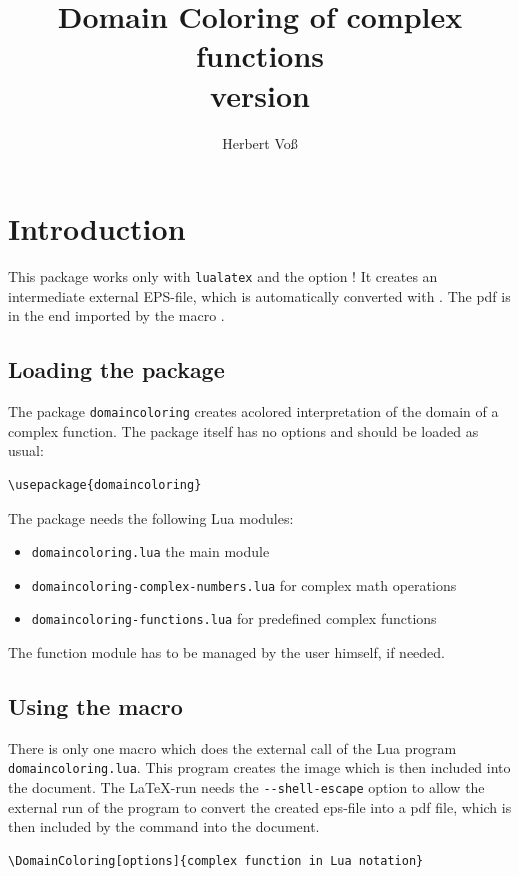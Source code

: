\documentclass[fontsize=11pt,english,BCOR=10mm,DIV=12,bibliography=totoc,parskip=false,headings=small,
    headinclude=false,footinclude=false,oneside]{pst-doc}
\title{Domain Coloring of complex functions\\version \DColFV}
\author{Herbert Voß}
\begin{document}
\settitle
\tableofcontents


\section{Introduction}

This package works only with \texttt{lualatex} and the option ! 
It creates an intermediate external EPS-file, which is automatically converted with
. The pdf is in the end imported by the macro .

\subsection{Loading the package}
The package \texttt{domaincoloring} creates acolored interpretation of the
domain of a complex function. The package itself has no options and should be loaded as
usual:

\begin{verbatim}
\usepackage{domaincoloring}
\end{verbatim}

The package needs the following Lua modules:

\begin{itemize}
\item \texttt{domaincoloring.lua}   the main module
\item \texttt{domaincoloring-complex-numbers.lua} for complex math operations
\item \texttt{domaincoloring-functions.lua}   for predefined complex functions
\end{itemize}

The function module has to be managed  by the user himself, if needed.



\subsection{Using the macro}

There is only one macro which does the external call of the Lua program \verb|domaincoloring.lua|.
This program creates the image which is then included into the document. The \LaTeX-run needs
the \verb|--shell-escape| option to allow the external run of the program to convert the created
eps-file into a pdf file, which is then included by the command  into
the document.


\begin{verbatim}
\DomainColoring[options]{complex function in Lua notation}
\end{verbatim}
\end{document}
